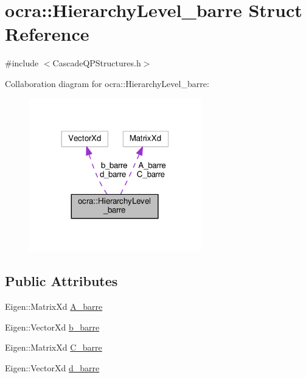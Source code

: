 \hypertarget{structocra_1_1HierarchyLevel__barre}{}\section{ocra\+:\+:Hierarchy\+Level\+\_\+barre Struct Reference}
\label{structocra_1_1HierarchyLevel__barre}


{\ttfamily \#include $<$Cascade\+Q\+P\+Structures.\+h$>$}



Collaboration diagram for ocra\+:\+:Hierarchy\+Level\+\_\+barre\+:
\nopagebreak
\begin{figure}[H]
\begin{center}
\leavevmode
\includegraphics[width=212pt]{d4/d3c/structocra_1_1HierarchyLevel__barre__coll__graph}
\end{center}
\end{figure}
\subsection*{Public Attributes}
\begin{DoxyCompactItemize}
\item 
Eigen\+::\+Matrix\+Xd \hyperlink{structocra_1_1HierarchyLevel__barre_a9e0797af20a5547e4c7b88d648e9a152}{A\+\_\+barre}
\item 
Eigen\+::\+Vector\+Xd \hyperlink{structocra_1_1HierarchyLevel__barre_a4b34116dea6da686e3b491a673adabde}{b\+\_\+barre}
\item 
Eigen\+::\+Matrix\+Xd \hyperlink{structocra_1_1HierarchyLevel__barre_a3d60346fbdc2ff5c366b6b5f7b802af1}{C\+\_\+barre}
\item 
Eigen\+::\+Vector\+Xd \hyperlink{structocra_1_1HierarchyLevel__barre_a65cc4a8fa90c825809493c2bbc921a3d}{d\+\_\+barre}
\end{DoxyCompactItemize}


